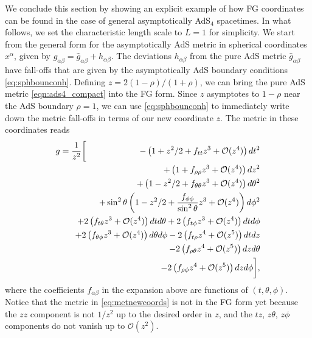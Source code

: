 \documentclass[aps,letterpaper,twocolumn,nofootinbib]{revtex4}
\numberwithin{equation}{section}
\begin{document}
We conclude this section by showing an explicit example of how FG coordinates can be found in the case of general asymptotically AdS$_4$ spacetimes. 
In what follows, we set the characteristic length scale to $L=1$ for simplicity.
We start from the general form for the asymptotically AdS metric in spherical coordinates $x^\alpha$, given by $g_{\alpha\beta}=\hat{g}_{\alpha\beta}+h_{\alpha\beta}$.
The deviations $h_{\alpha\beta}$ from the pure AdS metric $\hat{g}_{\alpha\beta}$ have fall-offs that are given by the asymptotically AdS boundary conditions \eqref{eq:sphbounconh}.
Defining $z=2(1-\rho)/(1+\rho)$, we can bring the pure AdS metric \eqref{eqn:ads4_compact} into the FG form.
Since $z$ asymptotes to $1-\rho$ near the AdS boundary $\rho=1$, we can use \eqref{eq:sphbounconh} to immediately write down the metric fall-offs in terms of our new coordinate $z$.
The metric in these coordinates reads
\begin{eqnarray}
\label{eq:metnewcoords}
g
&=\frac{1}{z^2}\biggl[& 
- \left(1+z^2/2+f_{tt}z^3+\mathcal{O}(z^4)\right)dt^2 \nonumber \\
&&\hspace{0.0cm} + \left(1+f_{\rho\rho}z^3+\mathcal{O}(z^4)\right)dz^2 \nonumber \\
&&\hspace{0.0cm} + \left(1-z^2/2+f_{\theta\theta}z^3 +\mathcal{O}(z^4) \right)d\theta^2 \nonumber \\
&&\hspace{0.0cm} + \sin^2\theta \left(1-z^2/2+\frac{f_{\phi\phi}}{\sin^2\theta} z^3 +\mathcal{O}(z^4) \right)d\phi^2 \nonumber \\ 
&&\hspace{-0.8cm}+ 2 \left( f_{t\theta}z^3 +\mathcal{O}(z^4)\right)dt d\theta + 2 \left( f_{t\phi} z^3+\mathcal{O}(z^4)\right)dt d\phi \nonumber \\
&&\hspace{-0.8cm}+ 2 \left(f_{\theta\phi} z^3 +\mathcal{O}(z^4)\right)d\theta d\phi - 2\left(f_{t\rho}z^4 +\mathcal{O}(z^5)\right)dtdz \nonumber \\
&&\hspace{-0.8cm}-2\left(f_{\rho\theta}z^4+\mathcal{O}(z^5)\right)dzd\theta \nonumber \\
&&\hspace{-0.8cm}-2\left(f_{\rho\phi}z^4 +\mathcal{O}(z^5)\right)dzd\phi\biggr] ,
\end{eqnarray}
where the coefficients $f_{\alpha\beta}$ in the expansion above are functions of $(t,\theta,\phi)$. 
Notice that the metric in \eqref{eq:metnewcoords} is not in the FG form yet because the $zz$ component is not $1/z^2$ up to the desired order in $z$, and the $tz$, $z\theta$, $z\phi$ components do not vanish up to $\mathcal{O}(z^2)$.
\end{document}
